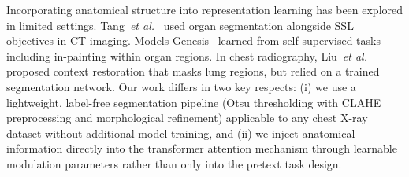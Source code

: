 Incorporating anatomical structure into representation learning has been explored in limited settings. Tang~\textit{et al.}~\cite{tang2022selfsupervised} used organ segmentation alongside SSL objectives in CT imaging. Models Genesis~\cite{zhou2021modelgenesis} learned from self-supervised tasks including in-painting within organ regions. In chest radiography, Liu~\textit{et al.}~\cite{liu2021selfsupervised} proposed context restoration that masks lung regions, but relied on a trained segmentation network. Our work differs in two key respects: (i) we use a lightweight, label-free segmentation pipeline (Otsu thresholding with CLAHE preprocessing and morphological refinement) applicable to any chest X-ray dataset without additional model training, and (ii) we inject anatomical information directly into the transformer attention mechanism through learnable modulation parameters rather than only into the pretext task design.
